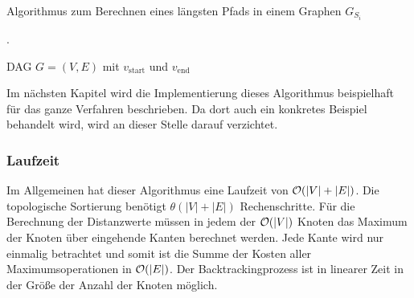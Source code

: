 \begin{breakablealgorithm}
	\caption{Algorithmus zum Berechnen eines längsten Pfads in einem Graphen $G_{S_i}$}.
	\label{alg:longestpath}
	\begin{algorithmic}[1]
		\Require DAG $G = (V,E)$ mit $v_{\mathrm{start}}$ und $v_{\mathrm{end}}$
			 
					\EndIf
				\EndFor
			\EndWhile
			 	
			 
			\EndWhile
		\EndProcedure
	\end{algorithmic}
\end{breakablealgorithm}

Im nächsten Kapitel wird die Implementierung dieses Algorithmus beispielhaft für das ganze Verfahren beschrieben. Da dort auch ein konkretes Beispiel behandelt wird, wird an dieser Stelle darauf verzichtet.

\subsubsection{Laufzeit}

Im Allgemeinen hat dieser Algorithmus eine Laufzeit von $\mathcal{O}(|V| + |E|)$. Die topologische Sortierung benötigt $\theta(|V| + |E|)$ Rechenschritte. Für die Berechnung der Distanzwerte müssen in jedem der $\mathcal{O}(|V|)$ Knoten das Maximum der Knoten über eingehende Kanten berechnet werden. Jede Kante wird nur einmalig betrachtet und somit ist die Summe der Kosten aller Maximumsoperationen in $\mathcal{O}(|E|)$. Der Backtrackingprozess ist in linearer Zeit in der Größe der Anzahl der Knoten möglich.

